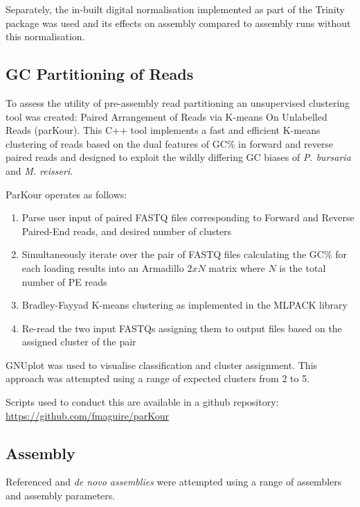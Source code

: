 Separately, the in-built digital normalisation implemented as part of the Trinity package
was used and its effects on assembly compared to assembly runs without this normalisation.

\subsection{GC Partitioning of Reads}

To assess the utility of pre-assembly read partitioning an unsupervised clustering tool was created:
Paired Arrangement of Reads via K-means On Unlabelled Reads (parKour).
This C++ tool implements a fast and efficient K-means clustering of reads based on the dual features
of GC\% in forward and reverse paired reads and designed to exploit the wildly differing GC
biases of \textit{P. bursaria} and \textit{M. reisseri}.

ParKour operates as follows:
\begin{enumerate}
    \item Parse user input of paired FASTQ files corresponding to Forward and Reverse Paired-End reads, and desired number of clusters
    \item Simultaneously iterate over the pair of FASTQ files calculating the GC\% for each loading results into an Armadillo \(2xN\) matrix \citep{Sanderson2010} where \(N\) is the total number of PE reads
    \item Bradley-Fayyad K-means \citep{Bradley1998} clustering as implemented in the MLPACK library \citep{mlpack2013}
    \item Re-read the two input FASTQs assigning them to output files based on the assigned cluster of the pair
\end{enumerate}

GNUplot \citep{Gnuplot_4.4} was used to visualise classification and cluster assignment.
This approach was attempted using a range of expected clusters from 2 to 5.

Scripts used to conduct this are available in a github repository:
\url{https://github.com/fmaguire/parKour}



\subsection{Assembly}

Referenced and \textit{de novo assemblies} were attempted using a range of assemblers
and assembly parameters.


